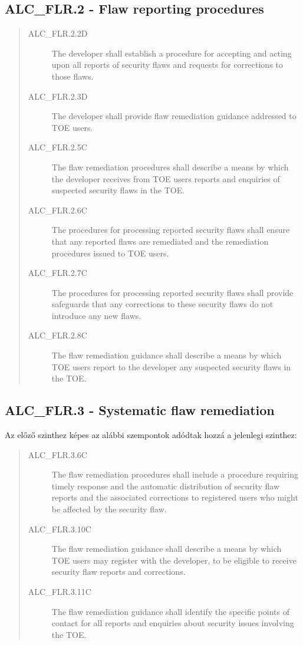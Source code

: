 \subsection{ALC\_FLR.2 - Flaw reporting procedures}
\begin{quote}
    \begin{description}
        \item[ALC\_FLR.2.2D]{The developer shall establish a procedure for accepting and acting upon
            all reports of security flaws and requests for corrections to those flaws.}
        \item[ALC\_FLR.2.3D]{The developer shall provide flaw remediation guidance addressed to TOE
            users.}
        \item[ALC\_FLR.2.5C]{The flaw remediation procedures shall describe a means by which the
            developer receives from TOE users reports and enquiries of suspected security flaws in
        the TOE.}
        \item[ALC\_FLR.2.6C]{The procedures for processing reported security flaws shall ensure that
            any reported flaws are remediated and the remediation procedures issued to TOE users.}
        \item[ALC\_FLR.2.7C]{The procedures for processing reported security flaws shall provide
            safeguards that any corrections to these security flaws do not introduce any new flaws.}
        \item[ALC\_FLR.2.8C]{The flaw remediation guidance shall describe a means by which TOE users
            report to the developer any suspected security flaws in the TOE.}
    \end{description}
\end{quote}

\subsection{ALC\_FLR.3 - Systematic flaw remediation}

Az előző szinthez képes az alábbi szempontok adódtak hozzá a jelenlegi szinthez:
\begin{quote}
    \begin{description}
        \item[ALC\_FLR.3.6C]{The flaw remediation procedures shall include a procedure requiring
            timely response and the automatic distribution of security flaw reports and the
            associated corrections to registered users who might be affected by the security flaw.}
        \item[ALC\_FLR.3.10C]{The flaw remediation guidance shall describe a means by which TOE
            users may register with the developer, to be eligible to receive security flaw reports
            and corrections.}
        \item[ALC\_FLR.3.11C]{The flaw remediation guidance shall identify the specific points of
            contact for all reports and enquiries about security issues involving the TOE.}
    \end{description}
\end{quote}

